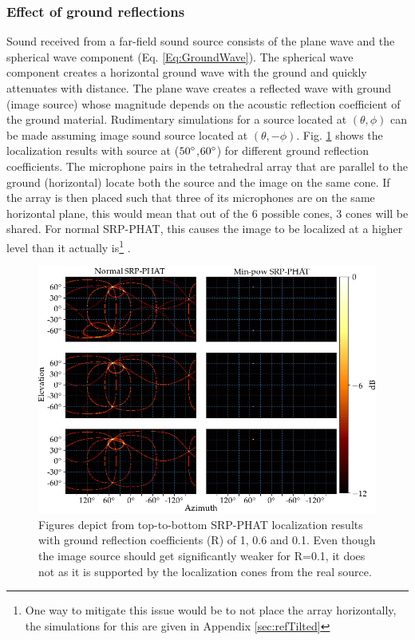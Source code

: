 \subsubsection{Effect of ground reflections}
Sound received from a far-field sound source consists of the plane wave and the spherical wave component (Eq. \ref{Eq:GroundWave}). The spherical wave component creates a horizontal ground wave with the ground and quickly attenuates with distance. The plane wave creates a reflected wave with ground (image source) whose magnitude depends on the acoustic reflection coefficient of the ground material. Rudimentary simulations for a source located at $(\theta,\phi)$ can be made assuming image sound source located at $(\theta,-\phi)$. Fig. \ref{fig:4mic1srcRef} shows the localization results with source at ($50\degree$,$60\degree$) for different ground reflection coefficients. The microphone pairs in the tetrahedral array that are parallel to the ground (horizontal) locate both the source and the image on the same cone. If the array is then placed such that three of its microphones are on the same horizontal plane, this would mean that out of the 6 possible cones, 3 cones will be shared. For normal SRP-PHAT, this causes the image to be localized at a higher level than it actually is\footnote{One way to mitigate this issue would be to not place the array horizontally, the simulations for this are given in Appendix \ref{sec:refTilted}} . 
\begin{figure}[H]
\centering
\includegraphics[width=\textwidth]{Figures/refSim.png}
\caption{Figures depict from top-to-bottom SRP-PHAT localization results with ground reflection coefficients (R) of 1, 0.6 and 0.1. Even though the image source should get significantly weaker for R=0.1, it does not as it is supported by the localization cones from the real source.}
\label{fig:4mic1srcRef}
\end{figure}

